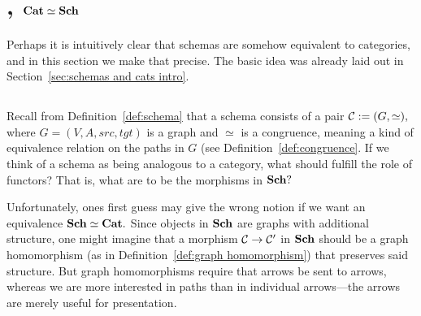 \documentclass[CT4S-EN-RU]{subfiles}
\begin{document}
\section{, \texorpdfstring{${\mathbf{Cat}}\simeq{\mathbf{Sch}}$}{Cat = Sch}}\label{sec:cat equiv sch}

\begin{blockENG}
Perhaps it is intuitively clear that schemas are somehow equivalent to categories, and in this section we make that precise. The basic idea was already laid out in Section~\ref{sec:schemas and cats intro}.
\end{blockENG}

\begin{blockRUS}
\end{blockRUS}


\subsection{}\label{sec:sch as category}

\begin{blockENG}
Recall from Definition~\ref{def:schema} that a schema consists of a pair $\mathcal{C}:=(G,\simeq),$ where $G=(V,A,src,tgt)$ is a graph and $\simeq$ is a congruence, meaning a kind of equivalence relation on the paths in $G$ (see Definition~\ref{def:congruence}. If we think of a schema as being analogous to a category, what should fulfill the role of functors? That is, what are to be the morphisms in ${\mathbf{Sch}}?$
\end{blockENG}

\begin{blockRUS}
\end{blockRUS}

\begin{blockENG}
Unfortunately, ones first guess may give the wrong notion if we want an equivalence ${\mathbf{Sch}}\simeq{\mathbf{Cat}}.$ Since objects in ${\mathbf{Sch}}$ are graphs with additional structure, one might imagine that a morphism $\mathcal{C}\rightarrow\mathcal{C}'$ in ${\mathbf{Sch}}$ should be a graph homomorphism (as in Definition~\ref{def:graph homomorphism}) that preserves said structure. But graph homomorphisms require that arrows be sent to arrows, whereas we are more interested in paths than in individual arrows—the arrows are merely useful for presentation. 
\end{blockENG}
\end{document}
